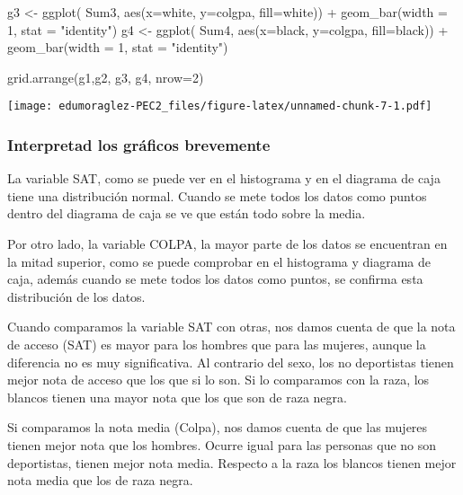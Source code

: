 \documentclass[
]{article}
\newenvironment{Shaded}{\begin{snugshade}}{\end{snugshade}}
\newcommand{\AttributeTok}[1]{\textcolor[rgb]{0.80,0.80,0.80}{#1}}
\newcommand{\DecValTok}[1]{\textcolor[rgb]{0.86,0.86,0.80}{#1}}
\newcommand{\FunctionTok}[1]{\textcolor[rgb]{0.94,0.94,0.56}{#1}}
\newcommand{\NormalTok}[1]{\textcolor[rgb]{0.80,0.80,0.80}{#1}}
\newcommand{\OtherTok}[1]{\textcolor[rgb]{0.94,0.94,0.56}{#1}}
\newcommand{\SpecialCharTok}[1]{\textcolor[rgb]{0.86,0.64,0.64}{#1}}
\newcommand{\StringTok}[1]{\textcolor[rgb]{0.80,0.58,0.58}{#1}}
\begin{document}
\begin{Shaded}
\begin{Highlighting}[]
\NormalTok{g3 }\OtherTok{\textless{}{-}}  \FunctionTok{ggplot}\NormalTok{( Sum3, }\FunctionTok{aes}\NormalTok{(}\AttributeTok{x=}\NormalTok{white, }\AttributeTok{y=}\NormalTok{colgpa, }\AttributeTok{fill=}\NormalTok{white)) }\SpecialCharTok{+} \FunctionTok{geom\_bar}\NormalTok{(}\AttributeTok{width =} \DecValTok{1}\NormalTok{, }\AttributeTok{stat =} \StringTok{"identity"}\NormalTok{)}
\NormalTok{g4 }\OtherTok{\textless{}{-}}  \FunctionTok{ggplot}\NormalTok{( Sum4, }\FunctionTok{aes}\NormalTok{(}\AttributeTok{x=}\NormalTok{black, }\AttributeTok{y=}\NormalTok{colgpa, }\AttributeTok{fill=}\NormalTok{black)) }\SpecialCharTok{+} \FunctionTok{geom\_bar}\NormalTok{(}\AttributeTok{width =} \DecValTok{1}\NormalTok{, }\AttributeTok{stat =} \StringTok{"identity"}\NormalTok{)}

\FunctionTok{grid.arrange}\NormalTok{(g1,g2, g3, g4, }\AttributeTok{nrow=}\DecValTok{2}\NormalTok{)}
\end{Highlighting}
\end{Shaded}

\texttt{[image: edumoraglez-PEC2\_files/figure-latex/unnamed-chunk-7-1.pdf]}

\hypertarget{interpretad-los-gruxe1ficos-brevemente}{%
\subsubsection{Interpretad los gráficos
brevemente}\label{interpretad-los-gruxe1ficos-brevemente}}

La variable SAT, como se puede ver en el histograma y en el diagrama de
caja tiene una distribución normal. Cuando se mete todos los datos como
puntos dentro del diagrama de caja se ve que están todo sobre la media.

Por otro lado, la variable COLPA, la mayor parte de los datos se
encuentran en la mitad superior, como se puede comprobar en el
histograma y diagrama de caja, además cuando se mete todos los datos
como puntos, se confirma esta distribución de los datos.

Cuando comparamos la variable SAT con otras, nos damos cuenta de que la
nota de acceso (SAT) es mayor para los hombres que para las mujeres,
aunque la diferencia no es muy significativa. Al contrario del sexo, los
no deportistas tienen mejor nota de acceso que los que si lo son. Si lo
comparamos con la raza, los blancos tienen una mayor nota que los que
son de raza negra.

Si comparamos la nota media (Colpa), nos damos cuenta de que las mujeres
tienen mejor nota que los hombres. Ocurre igual para las personas que no
son deportistas, tienen mejor nota media. Respecto a la raza los blancos
tienen mejor nota media que los de raza negra.
\end{document}
